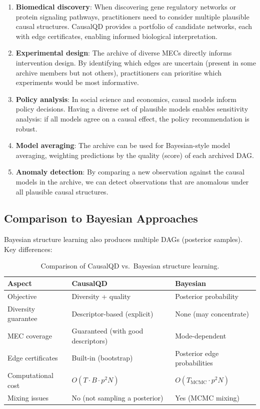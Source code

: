 \documentclass[11pt,a4paper]{article}
\begin{document}
\begin{enumerate}[leftmargin=*]
    \item \textbf{Biomedical discovery}: When discovering gene regulatory networks or protein signaling pathways, practitioners need to consider multiple plausible causal structures. CausalQD provides a portfolio of candidate networks, each with edge certificates, enabling informed biological interpretation.
    
    \item \textbf{Experimental design}: The archive of diverse MECs directly informs intervention design. By identifying which edges are uncertain (present in some archive members but not others), practitioners can prioritise which experiments would be most informative.
    
    \item \textbf{Policy analysis}: In social science and economics, causal models inform policy decisions. Having a diverse set of plausible models enables sensitivity analysis: if all models agree on a causal effect, the policy recommendation is robust.
    
    \item \textbf{Model averaging}: The archive can be used for Bayesian-style model averaging, weighting predictions by the quality (score) of each archived DAG.
    
    \item \textbf{Anomaly detection}: By comparing a new observation against the causal models in the archive, we can detect observations that are anomalous under all plausible causal structures.
\end{enumerate}

\subsection{Comparison to Bayesian Approaches}

Bayesian structure learning \citep{friedman2003being,kuipers2017partition} also produces multiple DAGs (posterior samples). Key differences:

\begin{table}[h]
\centering
\caption{Comparison of CausalQD vs.\ Bayesian structure learning.}
\label{tab:bayesian-comparison}
\begin{tabular}{@{}p{3cm}|p{5cm}|p{5cm}@{}}
\toprule
\textbf{Aspect} & \textbf{CausalQD} & \textbf{Bayesian} \\
\midrule
Objective & Diversity + quality & Posterior probability \\
Diversity guarantee & Descriptor-based (explicit) & None (may concentrate) \\
MEC coverage & Guaranteed (with good descriptors) & Mode-dependent \\
Edge certificates & Built-in (bootstrap) & Posterior edge probabilities \\
Computational cost & $O(T \cdot B \cdot p^2 N)$ & $O(T_{\text{MCMC}} \cdot p^2 N)$ \\
Mixing issues & No (not sampling a posterior) & Yes (MCMC mixing) \\
\bottomrule
\end{tabular}
\end{table}
\end{document}
